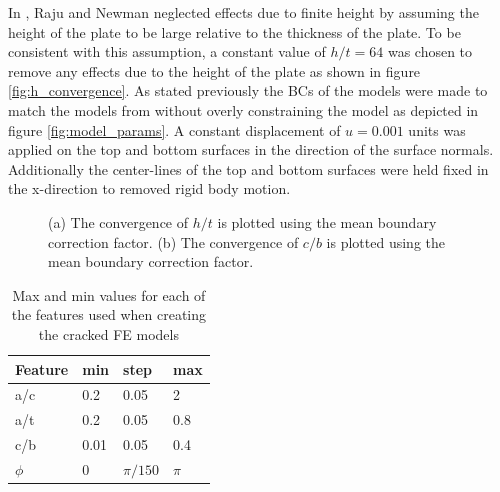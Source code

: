 In \cite{RNeqnsbook}, Raju and Newman neglected effects due to finite height by assuming the height of the plate to be large relative to the thickness of the plate. To be consistent with this assumption, a constant value of $h/t = 64$ was chosen to remove any effects due to the height of the plate as shown in figure \ref{fig:h_convergence}. As stated previously the BCs of the models were made to match the models from \cite{RNeqnsbook} without overly constraining the model as depicted in figure \ref{fig:model_params}. A constant displacement of $u = 0.001$ units was applied on the top and bottom surfaces in the direction of the surface normals. Additionally the center-lines of the top and bottom surfaces were held fixed in the x-direction to removed rigid body motion. 
\begin{figure}
    \centering
    \qquad
    \caption{(a) The convergence of $h/t$ is plotted using the mean boundary correction factor. (b) The convergence of $c/b$ is plotted using the mean boundary correction factor.}
    \label{fig:convergence_plots}
\end{figure}

\begin{table}[]
\centering
\begin{tabular}{|l|l|l|l|}
\hline
\textbf{Feature} & \textbf{min} & \textbf{step} & \textbf{max} \\ \hline
a/c              & 0.2          & 0.05          & 2            \\ \hline
a/t              & 0.2          & 0.05          & 0.8          \\ \hline
c/b              & 0.01         & 0.05          & 0.4          \\ \hline
$\phi$           & 0            & $\pi / 150$  & $\pi$        \\ \hline
\end{tabular}
\caption{Max and min values for each of the features used when creating the cracked FE models}
\label{table:feat_range}
\end{table}


